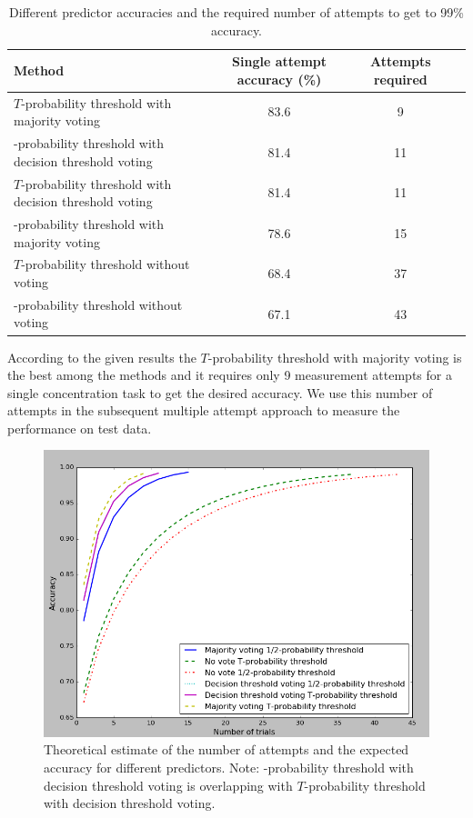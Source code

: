 \documentclass[12pt]{article}
\theoremstyle{definition}
\begin{document}
\begin{table}[H]
\begin{center}
  \begin{tabular}{ | l | c | c | c | }
    \hline
    Method & \parbox[c]{1.8cm}{\raggedright Single attempt accuracy (\%)} &\parbox[c]{1.8cm}{\raggedright Attempts required}\\ \hline
    $T$-probability threshold with majority voting & 83.6 & 9 \\ \hline
    -probability threshold with decision threshold voting & 81.4 & 11 \\ \hline
	$T$-probability threshold with decision threshold voting & 81.4 & 11 \\ \hline
	-probability threshold with majority voting & 78.6 & 15 \\ \hline
    $T$-probability threshold without voting & 68.4 & 37\\ \hline
    -probability threshold without voting & 67.1 & 43\\ \hline
  \end{tabular}
\end{center}
\caption{Different predictor accuracies and the required number of attempts to get to 99\% accuracy.}
\end{table}

According to the given results the $T$-probability threshold with majority voting is the best among the methods and it requires only 9 measurement attempts for a single concentration task to get the desired accuracy. We use this number of attempts in the subsequent multiple attempt approach to measure the performance on test data.

\begin{figure} [H]
\begin{center}
\includegraphics[width=1\textwidth]{condorcet_dependency_training}
\caption{Theoretical estimate of the number of attempts and the expected accuracy for different predictors. Note: -probability threshold with decision threshold voting is overlapping with $T$-probability threshold with decision threshold voting.}
\end{center}
\end{figure}
\end{document}
